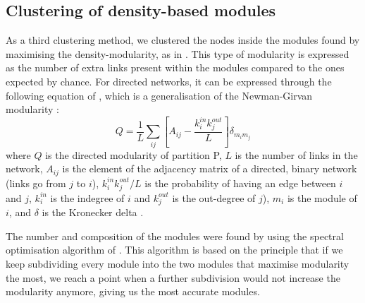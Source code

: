 \documentclass[twocolumn]{article}
\begin{document}
	\subsection*{Clustering of density-based modules}
		\par
		As a third clustering method, we clustered the nodes inside the modules found by maximising the density-modularity, as in \citet{Guimera2010}. This type of modularity is expressed as the number of extra links present within the modules compared to the ones expected by chance. For directed networks, it can be expressed through the following equation of \citet{Arenas2007}, which is a generalisation of the Newman-Girvan modularity \citep{Newman2004}:
			\begin{equation}
				Q=\frac{1}{L}\sum\limits_{ij}[A_{ij}-\frac{k_i^{in}k_j^{out}}{L}]\delta_{m_im_j} \label{eqn:modularitydensity}
			\end{equation}
		where $Q$ is the directed modularity of partition P, $L$ is the number of links in the network, $A_{ij}$ is the element of the adjacency matrix of a directed, binary network (links go from $j$ to $i$), $k_i^{in}k_j^{out}/L$ is the probability of having an edge between $i$ and $j$, $k^{in}_i$ is the indegree of $i$ and $k^{out}_j$ is the out-degree of $j$), $ m_i$ is the module of $i$, and $\delta$ is the Kronecker delta \citep{Kozen2007}.
		\par
		The number and composition of the modules were found by using the spectral optimisation algorithm of \citet{Leicht2008}. This algorithm is based on the principle that if we keep subdividing every module into the two modules that maximise modularity the most, we reach a point when a further subdivision would not increase the modularity anymore, giving us the most accurate modules.
\end{document}
